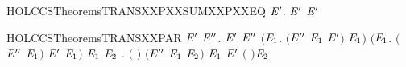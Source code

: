 \begin{SaveVerbatim}{HOLCCSTheoremsTRANSXXPXXSUMXXPXXEQ}
\HOLTokenTurnstile{} \HOLSymConst{\HOLTokenForall{}}  \ensuremath{\HOLBoundVar{E}\sp{\prime}}.  \HOLSymConst{\ensuremath{+}}  \HOLTokenTransBegin{}\HOLTokenTransEnd \ensuremath{\HOLBoundVar{E}\sp{\prime}} \HOLSymConst{\HOLTokenEquiv{}}  \HOLTokenTransBegin{}\HOLTokenTransEnd \ensuremath{\HOLBoundVar{E}\sp{\prime}}
\end{SaveVerbatim}
\newcommand{\HOLCCSTheoremsTRANSXXPXXSUMXXPXXEQ}{\UseVerbatim{HOLCCSTheoremsTRANSXXPXXSUMXXPXXEQ}}
\begin{SaveVerbatim}{HOLCCSTheoremsTRANSXXPAR}
\HOLTokenTurnstile{} \HOLSymConst{\HOLTokenForall{}} \ensuremath{\HOLBoundVar{E}\sp{\prime}}  \ensuremath{\HOLBoundVar{E}\sp{\prime\prime}}.
        \HOLSymConst{\ensuremath{\mid}} \ensuremath{\HOLBoundVar{E}\sp{\prime}} \HOLTokenTransBegin{}\HOLTokenTransEnd \ensuremath{\HOLBoundVar{E}\sp{\prime\prime}} \HOLSymConst{\HOLTokenImp{}}
       \ensuremath{(}\HOLSymConst{\HOLTokenExists{}}\ensuremath{\HOLBoundVar{E}\sb{\mathrm{1}}}. \ensuremath{(}\ensuremath{\HOLBoundVar{E}\sp{\prime\prime}} \HOLSymConst{\ensuremath{=}} \ensuremath{\HOLBoundVar{E}\sb{\mathrm{1}}} \HOLSymConst{\ensuremath{\mid}} \ensuremath{\HOLBoundVar{E}\sp{\prime}}\ensuremath{)} \HOLSymConst{\HOLTokenConj{}}  \HOLTokenTransBegin{}\HOLTokenTransEnd \ensuremath{\HOLBoundVar{E}\sb{\mathrm{1}}}\ensuremath{)} \HOLSymConst{\HOLTokenDisj{}}
       \ensuremath{(}\HOLSymConst{\HOLTokenExists{}}\ensuremath{\HOLBoundVar{E}\sb{\mathrm{1}}}. \ensuremath{(}\ensuremath{\HOLBoundVar{E}\sp{\prime\prime}} \HOLSymConst{\ensuremath{=}}  \HOLSymConst{\ensuremath{\mid}} \ensuremath{\HOLBoundVar{E}\sb{\mathrm{1}}}\ensuremath{)} \HOLSymConst{\HOLTokenConj{}} \ensuremath{\HOLBoundVar{E}\sp{\prime}} \HOLTokenTransBegin{}\HOLTokenTransEnd \ensuremath{\HOLBoundVar{E}\sb{\mathrm{1}}}\ensuremath{)} \HOLSymConst{\HOLTokenDisj{}}
       \HOLSymConst{\HOLTokenExists{}}\ensuremath{\HOLBoundVar{E}\sb{\mathrm{1}}} \ensuremath{\HOLBoundVar{E}\sb{\mathrm{2}}} .
           \ensuremath{(} \HOLSymConst{\ensuremath{=}} \HOLConst{\ensuremath{\tau}}\ensuremath{)} \HOLSymConst{\HOLTokenConj{}} \ensuremath{(}\ensuremath{\HOLBoundVar{E}\sp{\prime\prime}} \HOLSymConst{\ensuremath{=}} \ensuremath{\HOLBoundVar{E}\sb{\mathrm{1}}} \HOLSymConst{\ensuremath{\mid}} \ensuremath{\HOLBoundVar{E}\sb{\mathrm{2}}}\ensuremath{)} \HOLSymConst{\HOLTokenConj{}}  \HOLTokenTransBegin{} \HOLTokenTransEnd \ensuremath{\HOLBoundVar{E}\sb{\mathrm{1}}} \HOLSymConst{\HOLTokenConj{}}
           \ensuremath{\HOLBoundVar{E}\sp{\prime}} \HOLTokenTransBegin{} \ensuremath{(} \ensuremath{)}\HOLTokenTransEnd \ensuremath{\HOLBoundVar{E}\sb{\mathrm{2}}}
\end{SaveVerbatim}
